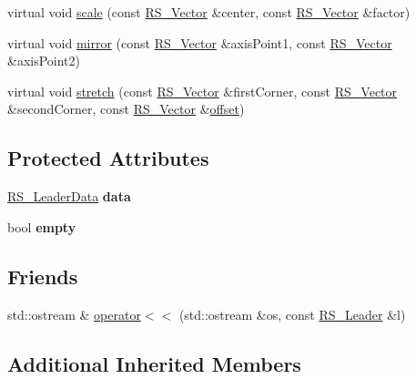 \begin{DoxyCompactItemize}
\item 
virtual void \hyperlink{classRS__Leader_a74340789879f91864d92215b500dbf79}{scale} (const \hyperlink{classRS__Vector}{R\-S\-\_\-\-Vector} \&center, const \hyperlink{classRS__Vector}{R\-S\-\_\-\-Vector} \&factor)
\item 
virtual void \hyperlink{classRS__Leader_a4545461540a770595880fd90bb4ebf7d}{mirror} (const \hyperlink{classRS__Vector}{R\-S\-\_\-\-Vector} \&axis\-Point1, const \hyperlink{classRS__Vector}{R\-S\-\_\-\-Vector} \&axis\-Point2)
\item 
virtual void \hyperlink{classRS__Leader_ad047ce839c842755094263af6a9bbd14}{stretch} (const \hyperlink{classRS__Vector}{R\-S\-\_\-\-Vector} \&first\-Corner, const \hyperlink{classRS__Vector}{R\-S\-\_\-\-Vector} \&second\-Corner, const \hyperlink{classRS__Vector}{R\-S\-\_\-\-Vector} \&\hyperlink{classRS__Entity_aa296d21b9aac99161d386ce2f60f0fea}{offset})
\end{DoxyCompactItemize}
\subsection*{Protected Attributes}
\begin{DoxyCompactItemize}
\item 
\hypertarget{classRS__Leader_af7b43390e05ffddd7794528b521098fd}{\hyperlink{classRS__LeaderData}{R\-S\-\_\-\-Leader\-Data} {\bfseries data}}\label{classRS__Leader_af7b43390e05ffddd7794528b521098fd}

\item 
\hypertarget{classRS__Leader_a28fb280cc8301f990771d7c3ef5ab5d8}{bool {\bfseries empty}}\label{classRS__Leader_a28fb280cc8301f990771d7c3ef5ab5d8}

\end{DoxyCompactItemize}
\subsection*{Friends}
\begin{DoxyCompactItemize}
\item 
std\-::ostream \& \hyperlink{classRS__Leader_a36354e56396e37afe1c624db22422130}{operator$<$$<$} (std\-::ostream \&os, const \hyperlink{classRS__Leader}{R\-S\-\_\-\-Leader} \&l)
\end{DoxyCompactItemize}
\subsection*{Additional Inherited Members}


